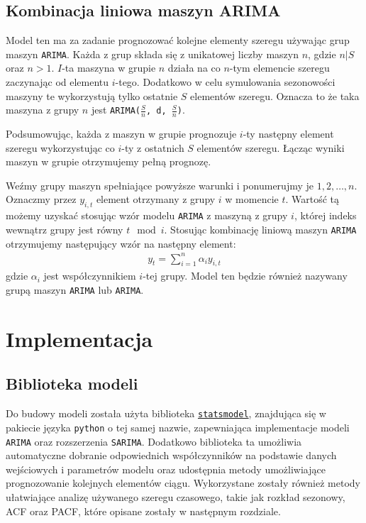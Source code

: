 \documentclass[12pt]{article}
\begin{document}
\subsection{Kombinacja liniowa maszyn ARIMA}
\label{group-arima}

Model ten ma za zadanie prognozować kolejne elementy szeregu używając grup maszyn \texttt{ARIMA}. Każda z grup składa się z unikatowej liczby maszyn $n$, gdzie $n|S$ oraz $n > 1$. $I$-ta maszyna w grupie $n$ działa na co $n$-tym elemencie szeregu zaczynając od elementu $i$-tego. Dodatkowo w celu symulowania sezonowości maszyny te wykorzystują tylko ostatnie $S$ elementów szeregu. Oznacza to że taka maszyna z grupy $n$ jest \texttt{ARIMA($\frac{S}{n}$, d, $\frac{S}{n}$)}.

Podsumowując, każda z maszyn w grupie prognozuje $i$-ty następny element szeregu wykorzystując co $i$-ty z ostatnich $S$ elementów szeregu. Łącząc wyniki maszyn w grupie otrzymujemy pełną prognozę.

Weźmy grupy maszyn spełniające powyższe warunki i ponumerujmy je $1, 2, \dots, n$. Oznaczmy przez $y_{i,t}$ element otrzymany z grupy $i$ w momencie $t$. Wartość tą możemy uzyskać stosując wzór modelu \texttt{ARIMA} z maszyną z grupy $i$, której indeks wewnątrz grupy jest równy $t \mod{i}$.
Stosując kombinację liniową maszyn \texttt{ARIMA} otrzymujemy następujący wzór na następny element:
\begin{gather*}
    y_t = \sum^n_{i=1}\alpha_iy_{i,t}
\end{gather*}
gdzie $\alpha_i$ jest współczynnikiem $i$-tej grupy. Model ten będzie również nazywany grupą maszyn \texttt{ARIMA} lub \texttt{ARIMA}.

\section{Implementacja}

\subsection{Biblioteka modeli}

Do budowy modeli została użyta biblioteka \href{https://www.statsmodels.org/stable/index.html}{\texttt{statsmodel}}, znajdująca się w pakiecie języka \texttt{python} o tej samej nazwie, zapewniająca implementacje modeli \texttt{ARIMA} oraz rozszerzenia \texttt{SARIMA}. Dodatkowo biblioteka ta umożliwia automatyczne dobranie odpowiednich współczynników na podstawie danych wejściowych i parametrów modelu oraz udostępnia metody umożliwiające prognozowanie kolejnych elementów ciągu. Wykorzystane zostały również metody ułatwiające analizę używanego szeregu czasowego, takie jak rozkład sezonowy, ACF oraz PACF, które opisane zostały w następnym rozdziale.
\end{document}
